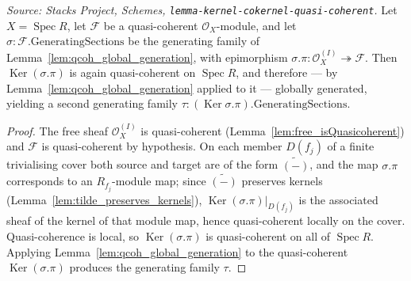 \begin{lemma}
  \label{lem:qcoh_kernel_qcoh}
  \textit{Source: Stacks Project, Schemes,
  \texttt{lemma-kernel-cokernel-quasi-coherent}.}
  Let \(X = \operatorname{Spec} R\), let \(\mathcal{F}\) be a quasi-coherent
  \(\mathcal{O}_X\)-module, and let \(\sigma : \mathcal{F}.\mathrm{GeneratingSections}\)
  be the generating family of Lemma~\ref{lem:qcoh_global_generation}, with epimorphism
  \(\sigma.\pi : \mathcal{O}_X^{(I)} \twoheadrightarrow \mathcal{F}\). Then
  \(\operatorname{Ker}(\sigma.\pi)\) is again quasi-coherent on \(\operatorname{Spec} R\),
  and therefore — by Lemma~\ref{lem:qcoh_global_generation} applied to it — globally
  generated, yielding a second generating family
  \(\tau : (\operatorname{Ker} \sigma.\pi).\mathrm{GeneratingSections}\).
\end{lemma}
\begin{proof}
  The free sheaf \(\mathcal{O}_X^{(I)}\) is quasi-coherent
  (Lemma~\ref{lem:free_isQuasicoherent}) and \(\mathcal{F}\) is quasi-coherent by
  hypothesis. On each member \(D(f_j)\) of a finite trivialising cover both source and
  target are of the form \(\widetilde{(-)}\), and the map \(\sigma.\pi\) corresponds to an
  \(R_{f_j}\)-module map; since \(\widetilde{(-)}\) preserves kernels
  (Lemma~\ref{lem:tilde_preserves_kernels}),
  \(\operatorname{Ker}(\sigma.\pi)|_{D(f_j)}\) is the associated sheaf of the kernel of
  that module map, hence quasi-coherent locally on the cover. Quasi-coherence is local,
  so \(\operatorname{Ker}(\sigma.\pi)\) is quasi-coherent on all of
  \(\operatorname{Spec} R\). Applying Lemma~\ref{lem:qcoh_global_generation} to the
  quasi-coherent \(\operatorname{Ker}(\sigma.\pi)\) produces the generating family
  \(\tau\).
\end{proof}

